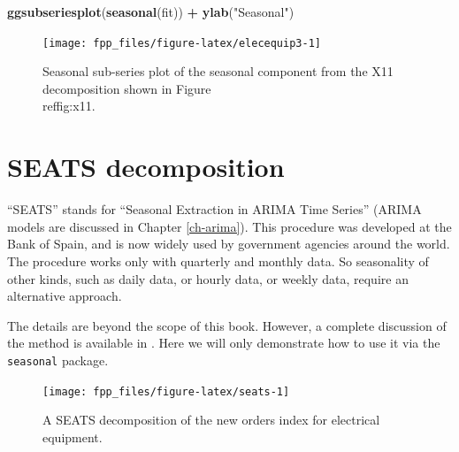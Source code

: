 \documentclass[]{book}
\newenvironment{Shaded}{\begin{snugshade}}{\end{snugshade}}
\newcommand{\KeywordTok}[1]{\textcolor[rgb]{0.13,0.29,0.53}{\textbf{#1}}}
\newcommand{\NormalTok}[1]{#1}
\newcommand{\OperatorTok}[1]{\textcolor[rgb]{0.81,0.36,0.00}{\textbf{#1}}}
\newcommand{\StringTok}[1]{\textcolor[rgb]{0.31,0.60,0.02}{#1}}
\begin{document}
\begin{Shaded}
\begin{Highlighting}[]
\KeywordTok{ggsubseriesplot}\NormalTok{(}\KeywordTok{seasonal}\NormalTok{(fit)) }\OperatorTok{+}\StringTok{ }\KeywordTok{ylab}\NormalTok{(}\StringTok{"Seasonal"}\NormalTok{)}
\end{Highlighting}
\end{Shaded}

\begin{figure}

{\centering \texttt{[image: fpp\_files/figure-latex/elecequip3-1]} 

}

\caption{Seasonal sub-series plot of the seasonal component from the X11 decomposition shown in Figure \\ref{fig:x11}.}\label{fig:elecequip3}
\end{figure}

\hypertarget{seats-decomposition}{%
\section{SEATS decomposition}\label{seats-decomposition}}

``SEATS'' stands for ``Seasonal Extraction in ARIMA Time Series'' (ARIMA models are discussed in Chapter \ref{ch-arima}). This procedure was developed at the Bank of Spain, and is now widely used by government agencies around the world. The procedure works only with quarterly and monthly data. So seasonality of other kinds, such as daily data, or hourly data, or weekly data, require an alternative approach.

The details are beyond the scope of this book. However, a complete discussion of the method is available in \citet{Dagum2016}. Here we will only demonstrate how to use it via the \texttt{seasonal} package.

\begin{Shaded}
\end{Shaded}

\begin{figure}

{\centering \texttt{[image: fpp\_files/figure-latex/seats-1]} 

}

\caption{A SEATS decomposition of the new orders index for electrical equipment.}\label{fig:seats}
\end{figure}
\end{document}
